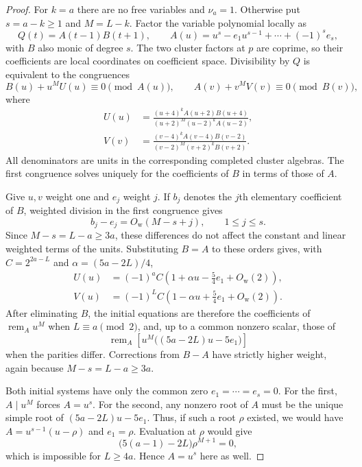 \documentclass[11pt]{article}
\theoremstyle{definition}
\begin{document}
\begin{proof}
For $k=a$ there are no free variables and $\nu_a=1$. Otherwise put
$s=a-k\ge1$ and $M=L-k$. Factor the variable polynomial locally as
\[
 Q(t)=A(t-1)B(t+1),\qquad
 A(u)=u^s-e_1u^{s-1}+\cdots+(-1)^se_s,
\]
with $B$ also monic of degree $s$. The two cluster factors at $p$ are
coprime, so their coefficients are local coordinates on coefficient
space. Divisibility by $Q$ is equivalent to the congruences
\[
 B(u)+u^MU(u)\equiv0\pmod{A(u)},\qquad
 A(v)+v^MV(v)\equiv0\pmod{B(v)},
\]
where
\[
 \begin{aligned}
 U(u)&=\frac{(u+4)^kA(u+2)B(u+4)}
                 {(u+2)^M(u-2)^kA(u-2)},\\
 V(v)&=\frac{(v-4)^kA(v-4)B(v-2)}
                 {(v-2)^M(v+2)^kB(v+2)}.
 \end{aligned}
\]
All denominators are units in the corresponding completed cluster
algebras. The first congruence solves uniquely for the coefficients
of $B$ in terms of those of $A$.

Give $u,v$ weight one and $e_j$ weight $j$. If $b_j$ denotes the
$j$th elementary coefficient of $B$, weighted division in the first
congruence gives
\[
 b_j-e_j=O_{\mathrm w}(M-s+j),\qquad 1\le j\le s.
\]
Since $M-s=L-a\ge3a$, these differences do not affect the constant
and linear weighted terms of the units. Substituting $B=A$ to these
orders gives, with $C=2^{2a-L}$ and $\alpha=(5a-2L)/4$,
\[
 \begin{aligned}
 U(u)&=(-1)^aC\left(1+\alpha u-\frac54e_1
                               +O_{\mathrm w}(2)\right),\\
 V(u)&=(-1)^LC\left(1-\alpha u+\frac54e_1
                               +O_{\mathrm w}(2)\right).
 \end{aligned}
\]
After eliminating $B$, the initial equations are therefore the
coefficients of $\operatorname{rem}_A u^M$ when $L\equiv a\pmod2$,
and, up to a common nonzero scalar, those of
\begin{equation}\label{eq:balanced-resonant-initial-polynomial}
 \operatorname{rem}_A
       \left[u^M\bigl((5a-2L)u-5e_1\bigr)\right]
\end{equation}
when the parities differ. Corrections from $B-A$ have strictly higher
weight, again because $M-s=L-a\ge3a$.

Both initial systems have only the common zero $e_1=\cdots=e_s=0$.
For the first, $A\mid u^M$ forces $A=u^s$. For the second, any
nonzero root of $A$ must be the unique simple root of
$(5a-2L)u-5e_1$. Thus, if such a root $\rho$ existed, we would have
$A=u^{s-1}(u-\rho)$ and $e_1=\rho$. Evaluation at $\rho$ would give
\[
 \bigl(5(a-1)-2L\bigr)\rho^{M+1}=0,
\]
which is impossible for $L\ge4a$. Hence $A=u^s$ here as well.


\end{proof}
\end{document}
